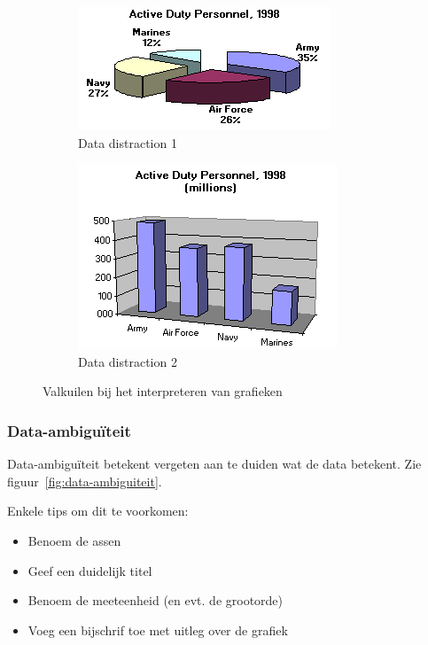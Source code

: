 \documentclass[a4paper,12pt]{article}
\begin{document}
\begin{figure}[H]
\begin{subfigure}{.49\textwidth}
  \label{fig:datadistortion}
\end{subfigure}
\begin{subfigure}{.49\textwidth}
  \centering
  \includegraphics[width=.9\linewidth]{img/Hoofdstuk_2/data_distraction_1.png}
  \caption{Data distraction 1}
  \label{fig:datadistraction1}
\end{subfigure}
\begin{subfigure}{.49\textwidth}
  \centering
  \includegraphics[width=.9\linewidth]{img/Hoofdstuk_2/data_distraction_2.png}
  \caption{Data distraction 2}
  \label{fig:datadistraction2}
\end{subfigure}
\caption{Valkuilen bij het interpreteren van grafieken}
\label{fig:ValkuilenGrafieken}
\end{figure}

\subsubsection{Data-ambiguïteit}
Data-ambiguïteit betekent vergeten aan te duiden wat de data betekent.
Zie figuur~\ref{fig:data-ambiguiteit}.

Enkele tips om dit te voorkomen:
\begin{itemize}
\item Benoem de assen
\item Geef een duidelijk titel
\item Benoem de meeteenheid (en evt. de grootorde)
\item Voeg een bijschrif toe met uitleg over de grafiek
\end{itemize}
\end{document}
